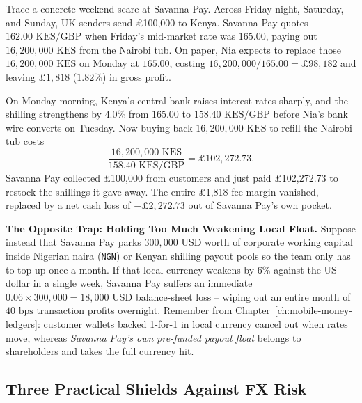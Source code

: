 Trace a concrete weekend scare at Savanna Pay. Across Friday night, Saturday, and Sunday, UK senders send \pounds 100,000 to Kenya. Savanna Pay quotes $162.00\text{ KES/GBP}$ when Friday's mid-market rate was $165.00$, paying out $16{,}200{,}000\text{ KES}$ from the Nairobi tub. On paper, Nia expects to replace those $16{,}200{,}000\text{ KES}$ on Monday at $165.00$, costing $16{,}200{,}000 / 165.00 = \pounds 98{,}182$ and leaving $\pounds 1{,}818$ ($1.82\%$) in gross profit.

On Monday morning, Kenya's central bank raises interest rates sharply, and the shilling strengthens by $4.0\%$ from $165.00$ to $158.40\text{ KES/GBP}$ before Nia's bank wire converts on Tuesday. Now buying back $16{,}200{,}000\text{ KES}$ to refill the Nairobi tub costs
\[
  \frac{16{,}200{,}000\text{ KES}}{158.40\text{ KES/GBP}} = \pounds 102{,}272.73.
\]
Savanna Pay collected \pounds 100,000 from customers and just paid \pounds 102,272.73 to restock the shillings it gave away. The entire \pounds 1,818 fee margin vanished, replaced by a net cash loss of $-\pounds 2{,}272.73$ out of Savanna Pay's own pocket.

\begin{trapbox}
\textbf{The Opposite Trap: Holding Too Much Weakening Local Float.} Suppose instead that Savanna Pay parks $300{,}000\text{ USD}$ worth of corporate working capital inside Nigerian naira (\texttt{NGN}) or Kenyan shilling payout pools so the team only has to top up once a month. If that local currency weakens by $6\%$ against the US dollar in a single week, Savanna Pay suffers an immediate $0.06 \times 300{,}000 = 18{,}000\text{ USD}$ balance-sheet loss -- wiping out an entire month of $40\text{ bps}$ transaction profits overnight. Remember from Chapter~\ref{ch:mobile-money-ledgers}: customer wallets backed 1-for-1 in local currency cancel out when rates move, whereas \emph{Savanna Pay's own pre-funded payout float} belongs to shareholders and takes the full currency hit.
\end{trapbox}

\subsection{Three Practical Shields Against FX Risk}

